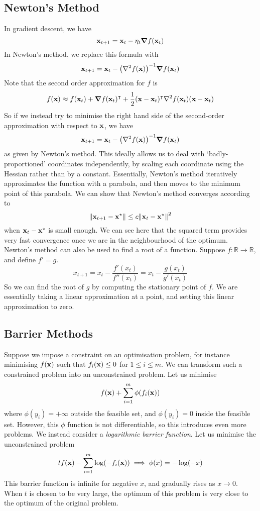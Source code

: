\subsection{Newton's Method}
In gradient descent, we have
\[
	\vb x_{t+1} = \vb x_t - \eta_t \grad{f(\vb x_t)}
\]
In Newton's method, we replace this formula with
\[
	\vb x_{t+1} = \vb x_t - \qty(\laplacian{f(\vb x)})^{-1} \grad{f(\vb x_t)}
\]
Note that the second order approximation for \(f\) is
\[
	f(\vb x) \approx f(\vb x_t) + \grad{f(\vb x_t)}^\transpose + \frac{1}{2}(\vb x - \vb x_t)^\transpose \laplacian{f(\vb x_t)}(\vb x - \vb x_t)
\]
So if we instead try to minimise the right hand side of the second-order approximation with respect to \(\vb x\), we have
\[
	\vb x_{t+1} = \vb x_t - \qty(\laplacian{f(\vb x)})^{-1} \grad{f(\vb x_t)}
\]
as given by Newton's method.
This ideally allows us to deal with `badly-proportioned' coordinates independently, by scaling each coordinate using the Hessian rather than by a constant.
Essentially, Newton's method iteratively approximates the function with a parabola, and then moves to the minimum point of this parabola.
We can show that Newton's method converges according to
\[
	\norm{\vb x_{t+1} - \vb x^\star} \leq c \norm{\vb x_{t} - \vb x^\star}^2
\]
when \(\vb x_t - \vb x^\star\) is small enough.
We can see here that the squared term provides very fast convergence once we are in the neighbourhood of the optimum.
Newton's method can also be used to find a root of a function.
Suppose \(f \colon \mathbb R \to \mathbb R\), and define \(f' = g\).
\[
	x_{t+1} = x_t - \frac{f'(x_t)}{f''(x_t)} = x_t - \frac{g(x_t)}{g'(x_t)}
\]
So we can find the root of \(g\) by computing the stationary point of \(f\).
We are essentially taking a linear approximation at a point, and setting this linear approximation to zero.

\subsection{Barrier Methods}
Suppose we impose a constraint on an optimisation problem, for instance minimising \(f(\vb x)\) such that \(f_i(\vb x) \leq 0\) for \(1 \leq i \leq m\).
We can transform such a constrained problem into an unconstrained problem.
Let us minimise
\[
	f(\vb x) + \sum_{i=1}^m \phi(f_i(\vb x))
\]
where \(\phi(y_i) = +\infty\) outside the feasible set, and \(\phi(y_i) = 0\) inside the feasible set.
However, this \(\phi\) function is not differentiable, so this introduces even more problems.
We instead consider a \textit{logarithmic barrier function}.
Let us minimise the unconstrained problem
\[
	tf(\vb x) - \sum_{i=1}^m \log(-f_i(\vb x)) \implies \phi(x) = -\log (-x)
\]
This barrier function is infinite for negative \(x\), and gradually rises as \(x \to 0\).
When \(t\) is chosen to be very large, the optimum of this problem is very close to the optimum of the original problem.

